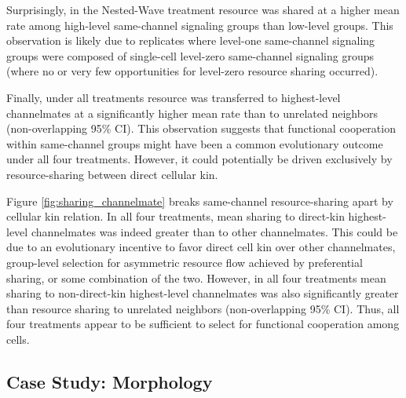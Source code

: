 Surprisingly, in the Nested-Wave treatment resource was shared at a higher mean rate among high-level same-channel signaling groups than low-level groups.
This observation is likely due to replicates where level-one same-channel signaling groups were composed of single-cell level-zero same-channel signaling groups (where no or very few opportunities for level-zero resource sharing occurred).

Finally, under all treatments resource was transferred to highest-level channelmates at a significantly higher mean rate than to unrelated neighbors (non-overlapping 95\% CI).
This observation suggests that functional cooperation within same-channel groups might have been a common evolutionary outcome under all four treatments.
However, it could potentially be driven exclusively by resource-sharing between direct cellular kin.

Figure \ref{fig:sharing_channelmate} breaks same-channel resource-sharing apart by cellular kin relation.
In all four treatments, mean sharing to direct-kin highest-level channelmates was indeed greater than to other channelmates.
This could be due to an evolutionary incentive to favor direct cell kin over other channelmates, group-level selection for asymmetric resource flow achieved by preferential sharing, or some combination of the two.
However, in all four treatments mean sharing to non-direct-kin highest-level channelmates was also significantly greater than resource sharing to unrelated neighbors (non-overlapping 95\% CI).
Thus, all four treatments appear to be sufficient to select for functional cooperation among cells.

\subsection{Case Study: Morphology} \label{sec:morphology}



